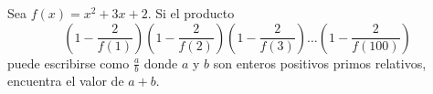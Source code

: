 Sea $f(x) = x^2 + 3x + 2$. Si el producto
\[\left(1-\frac{2}{f(1)}\right)\left(1-\frac{2}{f(2)}\right)\left(1-\frac{2}{f(3)}\right)\dots\left(1-\frac{2}{f(100)}\right)\]
puede escribirse como $\frac ab$ donde $a$ y $b$ son enteros positivos primos relativos, encuentra el valor de $a+b$.